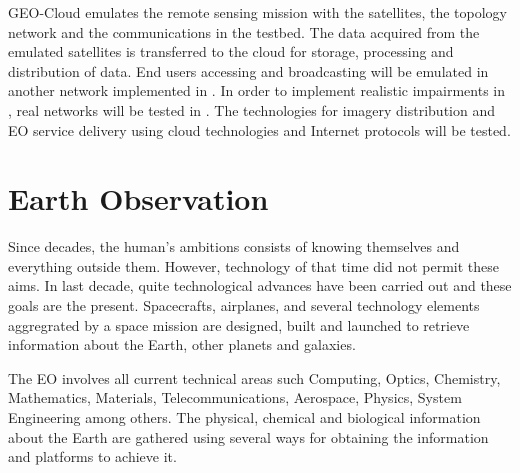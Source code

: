 GEO-Cloud  emulates the remote sensing mission with the satellites, the
topology network and the communications in the \vw testbed. The data
acquired from the emulated satellites is transferred to the \bonfire cloud
for storage, processing and distribution of data. End users accessing and
broadcasting will be emulated in another network implemented in \vw. In
order to implement realistic impairments in \vw, real networks will be
tested in \pl.  The technologies for imagery distribution and \ac{EO}
service delivery using cloud technologies and Internet protocols will be tested.

\section{Earth Observation}

Since decades, the human's ambitions consists of knowing themselves and
everything outside them. However, technology of that time did not permit these
aims. In last decade, quite technological advances have been carried out and
these goals are the present. Spacecrafts, airplanes, and several technology
elements aggregrated by a space mission are designed, built and launched to
retrieve information about the Earth, other planets and galaxies.

The \ac{EO} involves all current technical areas such Computing, Optics,
Chemistry, Mathematics, Materials, Telecommunications, Aerospace, Physics,
System Engineering among others. The physical, chemical and biological
information about the Earth are gathered using several ways for obtaining the
information and platforms to achieve it.   

